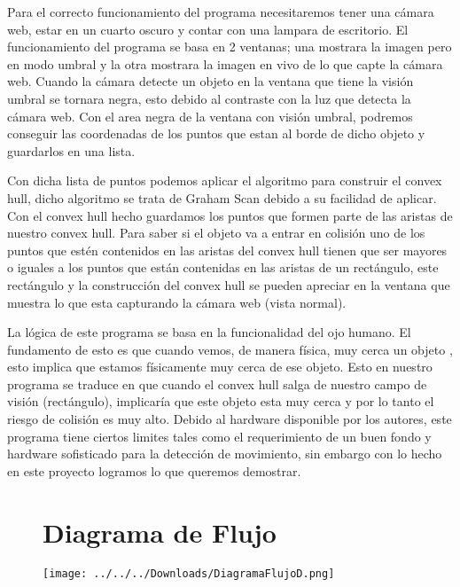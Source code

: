 \documentclass[11pt]{article}
\begin{document}
Para el correcto funcionamiento del programa necesitaremos tener una cámara web, estar en un cuarto oscuro y contar con una lampara de escritorio. El funcionamiento del programa se basa en 2 ventanas; una mostrara la imagen pero en modo umbral y la otra mostrara la imagen en vivo de lo que capte la cámara web. Cuando la cámara detecte un objeto en la ventana que tiene la visión umbral se tornara negra, esto debido al contraste con la luz que detecta la cámara web. Con el area negra de la ventana con visión umbral, podremos conseguir las coordenadas de los puntos que estan al borde de dicho objeto y guardarlos en una lista.

Con dicha lista de puntos podemos aplicar el algoritmo para construir el convex hull, dicho algoritmo se trata de Graham Scan debido a su facilidad de aplicar. Con el convex hull hecho guardamos los puntos que formen parte de las aristas de nuestro convex hull. Para saber si el objeto va a entrar en colisión uno de los puntos que estén contenidos en las aristas del convex hull tienen que ser mayores o iguales a los puntos que están contenidas en las aristas de un rectángulo, este rectángulo y la construcción del convex hull se pueden apreciar en la ventana que muestra lo que esta capturando la cámara web (vista normal).

La lógica de este programa se basa en la funcionalidad del ojo humano. El fundamento de esto es que cuando vemos, de manera física, muy cerca un objeto , esto implica que estamos físicamente muy cerca de ese objeto. Esto en nuestro programa se traduce en que cuando el convex hull salga de nuestro campo de visión (rectángulo), implicaría que este objeto esta muy cerca y por lo tanto el riesgo de colisión es muy alto. Debido al hardware disponible por los autores, este programa tiene ciertos limites tales como el requerimiento de un buen fondo y hardware sofisticado para la detección de movimiento, sin embargo con lo hecho en este proyecto logramos lo que queremos demostrar.
\begin{figure}[h!]
\section{Diagrama de Flujo}
\centering
\texttt{[image: ../../../Downloads/DiagramaFlujoD.png]}
\end{figure}
\end{document}
